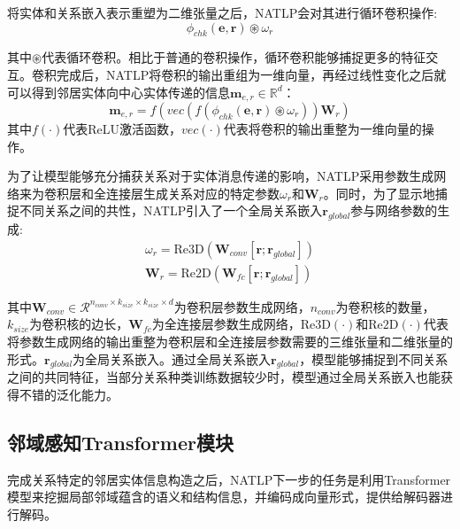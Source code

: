 将实体和关系嵌入表示重塑为二维张量之后，NATLP会对其进行循环卷积操作:
\begin{equation}
  \phi_{chk}\left(\boldsymbol{e},\boldsymbol{r}\right) \circledast \omega_r
\end{equation}

其中$\circledast$代表循环卷积。相比于普通的卷积操作，循环卷积能够捕捉更多的特征交互。卷积完成后，NATLP将卷积的输出重组为一维向量，再经过线性变化之后就可以得到邻居实体向中心实体传递的信息$\boldsymbol{m}_{e,r} \in \mathbb{R} ^d$：
\begin{equation}
  \boldsymbol{m}_{e,r}=f\left(vec\left(f\left(\phi_{chk}\left(\boldsymbol{e},\boldsymbol{r}\right) \circledast \omega_r \right)\right)\mathbf{W}_r\right)
\end{equation}
其中$f(\cdot )$代表ReLU激活函数，$vec(\cdot)$代表将卷积的输出重整为一维向量的操作。

为了让模型能够充分捕获关系对于实体消息传递的影响，NATLP采用参数生成网络来为卷积层和全连接层生成关系对应的特定参数$\omega_r$和$\mathbf{W}_r$。同时，为了显示地捕捉不同关系之间的共性，NATLP引入了一个全局关系嵌入$\boldsymbol{r}_{global}$参与网络参数的生成:
\begin{gather}
  \omega_r = \mbox{Re3D}\left(\mathbf{W}_{conv}\left[\boldsymbol{r};\boldsymbol{r}_{global}\right]\right) \\
  \mathbf{W}_r = \mbox{Re2D}\left(\mathbf{W}_{fc}\left[\boldsymbol{r};\boldsymbol{r}_{global}\right]\right)
\end{gather}

其中$\mathbf{W}_{conv} \in \mathcal{R}^{n_{conv}\times k_{size} \times k_{size} \times d}$为卷积层参数生成网络，$n_{conv}$为卷积核的数量，$k_{size}$为卷积核的边长，$\mathbf{W}_{fc}$为全连接层参数生成网络，$\mbox{Re3D}(\cdot)$和$\mbox{Re2D}(\cdot)$代表将参数生成网络的输出重整为卷积层和全连接层参数需要的三维张量和二维张量的形式。$\boldsymbol{r}_{global}$为全局关系嵌入。通过全局关系嵌入$\boldsymbol{r}_{global}$，模型能够捕捉到不同关系之间的共同特征，当部分关系种类训练数据较少时，模型通过全局关系嵌入也能获得不错的泛化能力。

\subsection{邻域感知Transformer模块}

完成关系特定的邻居实体信息构造之后，NATLP下一步的任务是利用Transformer模型来挖掘局部邻域蕴含的语义和结构信息，并编码成向量形式，提供给解码器进行解码。

